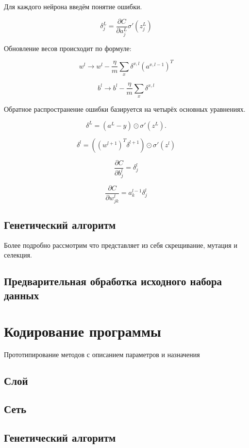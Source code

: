 \documentclass[a4paper,12pt]{article}
\begin{document}
Для каждого нейрона введём понятие ошибки.

{\large $$ \delta^L_j = \frac{\partial C}{\partial a^L_j} \sigma'(z^L_j)$$}

Обновление весов происходит по формуле:

{\large $$
	w^l \rightarrow
  	w^l-\frac{\eta}{m} \sum_x \delta^{x,l} (a^{x,l-1})^T
$$}

{\large $$
	b^l \rightarrow b^l-\frac{\eta}{m}
  \sum_x \delta^{x,l}
$$}


Обратное распространение ошибки базируется на четырёх основных уравнениях.

{\large $$ \delta^L = (a^L-y) \odot \sigma'(z^L).$$}

{\large $$ \delta^l = ((w^{l+1})^T \delta^{l+1}) \odot \sigma'(z^l)$$}

{\large $$ \frac{\partial C}{\partial b^l_j} = \delta^l_j$$}

{\large $$ \frac{\partial C}{\partial w^l_{jk}} = a^{l-1}_k \delta^l_j$$}



\subsection{Генетический алгоритм}
Более подробно рассмотрим что представляет из себя скрещивание, мутация и селекция.

\subsection{Предварительная обработка исходного набора данных}

\newpage\section{Кодирование программы}
Прототипирование методов с описанием параметров и назначения

\subsection{Слой}

\subsection{Сеть}

\subsection{Генетический алгоритм}
\end{document}
